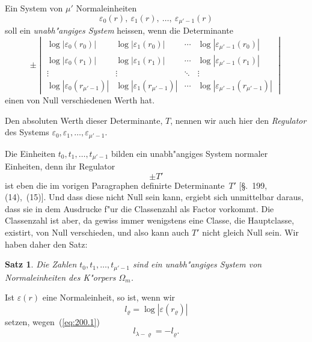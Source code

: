 \documentclass[10pt,a4paper]{article}
\theoremstyle{weberstyle}
\newtheorem{satz}{Satz}[section]
\begin{document}
Ein System von $\mu'$ Normaleinheiten
\[
\varepsilon_0(r),\ \varepsilon_1(r),\ \dots,\ \varepsilon_{\mu'-1}(r)
\]
soll ein \emph{unabh"angiges System} heissen, wenn die Determinante
\begin{equation}\label{eq:200.4}
\pm\begin{vmatrix}
\log|\varepsilon_0(r_0)| & \log|\varepsilon_1(r_0)| & \cdots &
\log|\varepsilon_{\mu'-1}(r_0)| \\
\log|\varepsilon_0(r_1)| & \log|\varepsilon_1(r_1)| & \cdots &
\log|\varepsilon_{\mu'-1}(r_1)| \\
\vdots & \vdots & \ddots & \vdots \\
\log|\varepsilon_0(r_{\mu'-1})| & \log|\varepsilon_1(r_{\mu'-1})| & \cdots &
\log|\varepsilon_{\mu'-1}(r_{\mu'-1})|
\end{vmatrix}
\end{equation}
einen von Null verschiedenen Werth hat.

Den absoluten Werth dieser Determinante, $T$, nennen wir auch hier den
\emph{Regulator} des Systems $\varepsilon_0,\varepsilon_1,\dots,\varepsilon_{\mu'-1}$.

Die Einheiten $t_0,t_1,\dots,t_{\mu'-1}$ bilden ein unabh"angiges System
normaler Einheiten, denn ihr Regulator
\[
\pm T'
\]
ist eben die im vorigen Paragraphen definirte Determinante~$T'$ [\S.~199,
(14),~(15)]. Und dass diese nicht Null sein kann, ergiebt sich unmittelbar
daraus, dass sie in dem Ausdrucke f"ur die Classenzahl als Factor
vorkommt. Die Classenzahl ist aber, da gewiss immer wenigstens eine
Classe, die Hauptclasse, existirt, von Null verschieden, und also kann
auch $T'$ nicht gleich Null sein. Wir haben daher den Satz:

\begin{satz}
Die Zahlen $t_0,t_1,\dots,t_{\mu'-1}$ sind ein unabh"angiges System
von Normaleinheiten des K"orpers $\Omega_m$.
\end{satz}

Ist $\varepsilon(r)$ eine Normaleinheit, so ist, wenn wir
\begin{equation}\label{eq:200.5}
l_\varrho = \log|\varepsilon(r_\varrho)|
\end{equation}
setzen, wegen~(\ref{eq:200.1})
\begin{equation}\label{eq:200.6}
l_{\lambda-\varrho} = -l_{\varrho}.
\end{equation}
\end{document}
